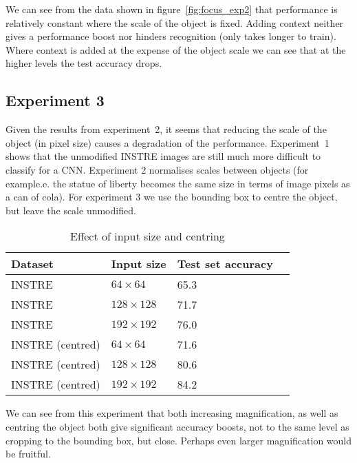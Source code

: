 We can see from the data shown in figure~\ref{fig:focus_exp2} that performance is relatively constant where the scale of the object is fixed. Adding context neither gives a performance boost nor hinders recognition (only takes longer to train). Where context is added at the expense of the object scale we can see that at the higher levels the test accuracy drops.


\subsection {Experiment 3}

Given the results from experiment~2, it seems that reducing the scale of the object (in pixel size) causes a degradation of the performance. Experiment~1 shows that the unmodified INSTRE images are still much more difficult to classify for a CNN. Experiment 2 normalises scales between objects (for example.e. the statue of liberty becomes the same size in terms of image pixels as a can of cola). For experiment 3 we use the bounding box to centre the object, but leave the scale unmodified.


\begin{table}[h]
  \centering
    \caption{Effect of input size and centring}
    
  \begin{tabular}{ l l l l }
    
    Dataset & Input size & Test set accuracy \\
    \toprule
    
    INSTRE &  $ 64 \times 64 $ & 65.3 \\
    INSTRE &  $ 128 \times 128 $  & 71.7 \\
    INSTRE &  $ 192 \times 192 $  & 76.0 \\
    
    \toprule
    INSTRE (centred) &  $ 64 \times 64 $ & 71.6 \\
    INSTRE (centred) &  $ 128 \times 128 $  & 80.6 \\
    INSTRE (centred) &  $ 192 \times 192 $  & 84.2 \\
    
    
    
    \bottomrule
  \end{tabular}
\label{fig:focus_input_size}
\end{table}



We can see from this experiment that both increasing magnification, as well as centring the object both give significant accuracy boosts, not to the same level as cropping to the bounding box, but close. Perhaps even larger magnification would be fruitful. 

